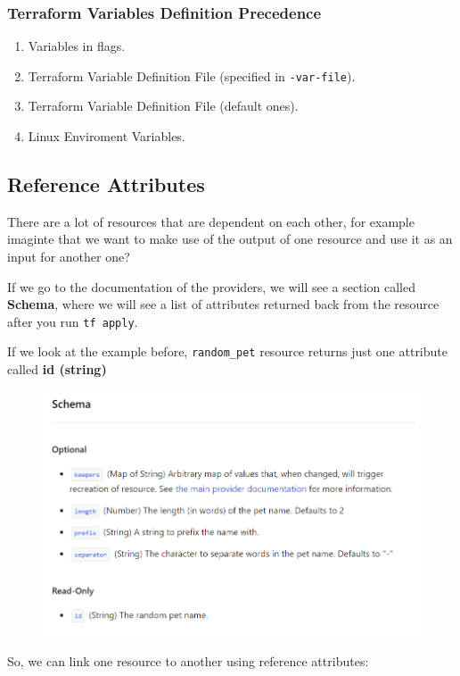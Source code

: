 \documentclass{article}
\begin{document}
\subsubsection{Terraform Variables Definition Precedence}
\begin{enumerate}
    \item Variables in flags.
    \item Terraform Variable Definition File (specified in \verb+-var-file+).
    \item Terraform Variable Definition File (default ones).
    \item Linux Enviroment Variables.
\end{enumerate}


\subsection{Reference Attributes}
There are a lot of resources that are dependent on each other, for example imaginte that we want to make use of the output of one resource and use it as an input for another one?

If we go to the documentation of the providers, we will see a section called \textbf{Schema}, where we will see a list of attributes returned back from the resource after you run \verb+tf apply+.

If we look at the example before, \verb+random_pet+ resource returns just one attribute called \textbf{id (string)}

\begin{figure}[H]
    \includegraphics[width=\textwidth]{pictures/pic7.png}
    \centering
\end{figure}

So, we can link one resource to another using reference attributes:
\end{document}
